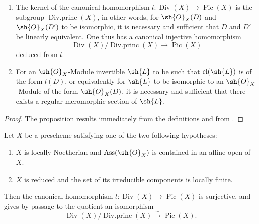 \begin{proposition}[21.3.3]
\label{IV.21.3.3}
\begin{enumerate}[label=\emph{(\roman*)}]
  \item The kernel of the canonical homomorphism $l:\operatorname{Div}(X)\to\operatorname{Pic}(X)$ is the subgroup $\operatorname{Div.princ}(X)$, in other words, for $\sh{O}_X(D)$ and $\sh{O}_X(D')$ to be isomorphic, it is necessary and sufficient that $D$ and $D'$ be linearly equivalent.
  One thus has a canonical injective homomorphism
  \[
  \label{IV.21.3.3.1}
    \operatorname{Div}(X)/\operatorname{Div.princ}(X)\to\operatorname{Pic}(X)
    \tag{21.3.3.1}
  \]
  deduced from $l$.
  \item For an $\sh{O}_X$-Module invertible $\sh{L}$ to be such that $\operatorname{cl}(\sh{L})$ is of the form $l(D)$, or equivalently for $\sh{L}$ to be isomorphic to an $\sh{O}_X$-Module of the form $\sh{O}_X(D)$, it is necessary and sufficient that there exists a regular meromorphic section of $\sh{L}$.
\end{enumerate}
\end{proposition}

\begin{proof}
The proposition results immediately from the definitions and from .
\end{proof}

\begin{proposition}[21.3.4]
\label{IV.21.3.4}
Let $X$ be a prescheme satisfying one of the two following hypotheses:
\begin{enumerate}[label=\emph{\alph*)}]
  \item $X$ is locally Noetherian and $\operatorname{Ass}(\sh{O}_X)$ is contained in an affine open of $X$.
  \item $X$ is reduced and the set of its irreducible components is locally finite.
\end{enumerate}
Then the canonical homomorphism $l:\operatorname{Div}(X)\to\operatorname{Pic}(X)$ is surjective, and gives by passage to the quotient an isomorphism
\[
  \operatorname{Div}(X)/\operatorname{Div.princ}(X)\xrightarrow{\sim}\operatorname{Pic}(X).
\]
\end{proposition}

